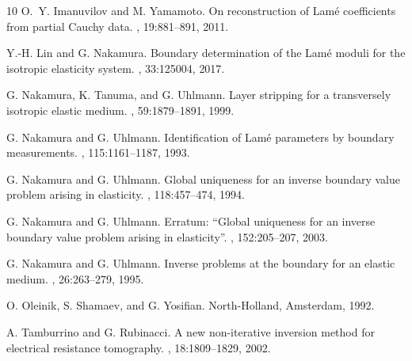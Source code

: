 \documentclass[reqno]{amsart}
\numberwithin{equation}{section}
\numberwithin{figure}{section}
\numberwithin{table}{section}
\theoremstyle{definition}
\theoremstyle{plain}
\theoremstyle{definition}
\theoremstyle{remark}
\numberwithin{equation}{section}
\begin{document}
\begin{thebibliography}{10}
O.~Y. Imanuvilov and M. Yamamoto.
\newblock On reconstruction of {L}am{\'e} coefficients from partial {C}auchy data.
, 19:881--891, 2011.

Y.-H. Lin and G. Nakamura.
\newblock Boundary determination of the {L}am{\'e} moduli for the isotropic elasticity system.
, 33:125004, 2017.

G. Nakamura, K. Tanuma, and G. Uhlmann.
\newblock Layer stripping for a transversely isotropic elastic medium.
, 59:1879--1891, 1999.

G. Nakamura and G. Uhlmann.
\newblock Identification of {L}am{\'e} parameters by boundary measurements.
, 115:1161--1187, 1993.

G. Nakamura and G. Uhlmann.
\newblock Global uniqueness for an inverse boundary value problem arising in elasticity.
, 118:457--474, 1994.

G. Nakamura and G. Uhlmann.
\newblock Erratum: ``Global uniqueness for an inverse boundary value problem arising in elasticity''.
, 152:205--207, 2003.

G. Nakamura and G. Uhlmann.
\newblock Inverse problems at the boundary for an elastic medium.
, 26:263--279, 1995.

O. Oleinik, S. Shamaev, and G. Yosifian.
\newblock North-Holland, Amsterdam, 1992.

A. Tamburrino and G. Rubinacci.
\newblock A new non-iterative inversion method for electrical resistance tomography.
, 18:1809--1829, 2002.

\end{thebibliography}
\end{document}
